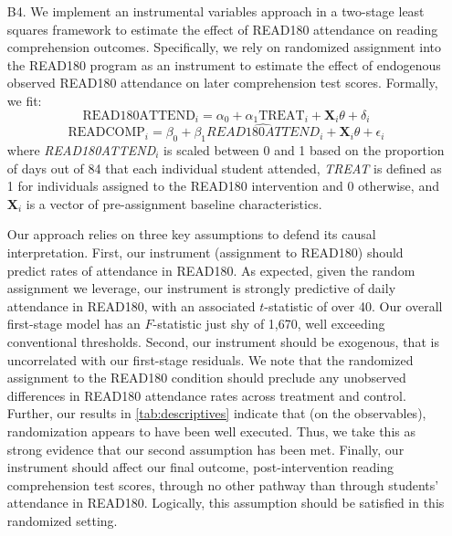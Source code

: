 \documentclass[a4paper, 11pt]{article}
\begin{document}
\begin{enumerate}
	\item[B4.] We implement an instrumental variables approach in a two-stage least squares framework to estimate the effect of READ180 attendance on reading comprehension outcomes. Specifically, we rely on randomized assignment into the READ180 program as an instrument to estimate the effect of endogenous observed READ180 attendance on later comprehension test scores. Formally, we fit:
	\begin{equation}
	\text{READ180ATTEND}_i = \alpha_0 + \alpha_1 \text{TREAT}_i + \textbf{X}_i \theta + \delta_i
	\end{equation}
	\begin{equation}
	\text{READCOMP}_i = \beta_0 + \beta_1 \hat{READ180ATTEND}_i + \textbf{X}_i \theta + \epsilon_i
	\end{equation}
	where \textit{READ180ATTEND}$_{i}$ is scaled between 0 and 1 based on the proportion of days out of 84 that each individual student attended, \textit{TREAT} is defined as 1 for individuals assigned to the READ180 intervention and 0 otherwise, and \textbf{X}$_{i}$ is a vector of pre-assignment baseline characteristics. 
	
	Our approach relies on three key assumptions to defend its causal interpretation. First, our instrument (assignment to READ180) should predict rates of attendance in READ180. As expected, given the random assignment we leverage, our instrument is strongly predictive of daily attendance in READ180, with an associated $t$-statistic of over 40. Our overall first-stage model has an $F$-statistic just shy of 1,670, well exceeding conventional thresholds. Second, our instrument should be exogenous, that is uncorrelated with our first-stage residuals. We note that the randomized assignment to the READ180 condition should preclude any unobserved differences in READ180 attendance rates across treatment and control. Further, our results in \autoref{tab:descriptives} indicate that (on the observables), randomization appears to have been well executed. Thus, we take this as strong evidence that our second assumption has been met. Finally, our instrument should affect our final outcome, post-intervention reading comprehension test scores, through no other pathway than through students' attendance in READ180. Logically, this assumption should be satisfied in this randomized setting.
	

\end{enumerate}
\end{document}
